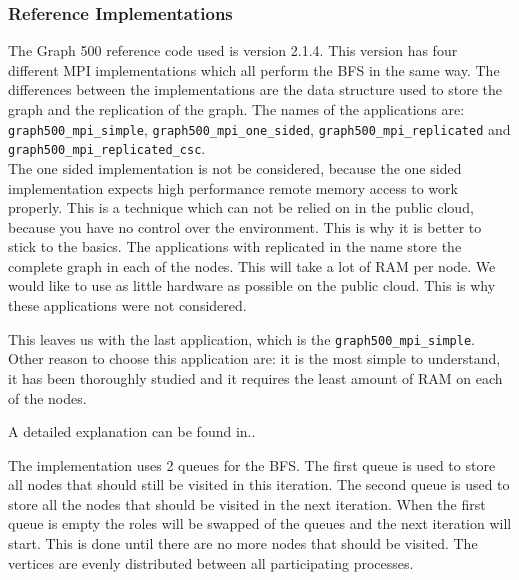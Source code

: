 \subsubsection{Reference Implementations}

The Graph 500 reference code\cite{graph500-code} used is version 2.1.4. This version has four different MPI implementations which all perform the BFS in the same way. The differences between the implementations are the data structure used to store the graph and the replication of the graph. The names of the applications are: \texttt{graph500\_mpi\_simple}, \texttt{graph500\_mpi\_one\_sided}, \texttt{graph500\_mpi\_replicated} and \texttt{graph500\_mpi\_replicated\_csc}.
\\ 
The one sided implementation is not be considered, because the one sided implementation expects high performance remote memory access to work properly. This is a technique which can not be relied on in the public cloud, because you have no control over the environment. This is why it is better to stick to the basics. The applications with replicated in the name store the complete graph in each of the nodes. This will take a lot of RAM per node. We would like to use as little hardware as possible on the public cloud. This is why these applications were not considered.

This leaves us with the last application, which is the \texttt{graph500\_mpi\_simple}. Other reason to choose this application are: it is the most simple to understand, it has been thoroughly studied and it requires the least amount of RAM on each of the nodes. 

A detailed explanation can be found in.\cite{suzumura2011performance}.

The implementation uses 2 queues for the BFS. The first queue is used to store all nodes that should still be visited in this iteration. The second queue is used to store all the nodes that should be visited in the next iteration. When the first queue is empty the roles will be swapped of the queues and the next iteration will start. This is done until there are no more nodes that should be visited. The vertices are evenly distributed between all participating processes.

